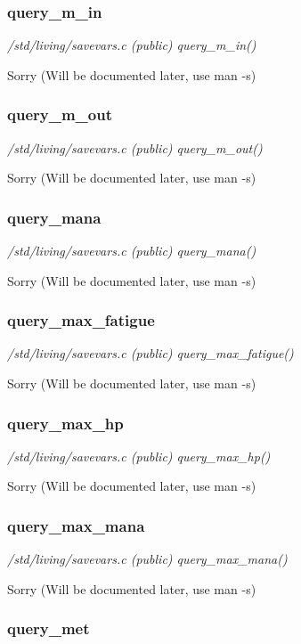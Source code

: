 \subsubsection{query\_m\_in}

{\em /std/living/savevars.c (public) query\_m\_in()}

Sorry (Will be documented later, use man -s)


\subsubsection{query\_m\_out}

{\em /std/living/savevars.c (public) query\_m\_out()}

Sorry (Will be documented later, use man -s)


\subsubsection{query\_mana}

{\em /std/living/savevars.c (public) query\_mana()}

Sorry (Will be documented later, use man -s)


\subsubsection{query\_max\_fatigue}

{\em /std/living/savevars.c (public) query\_max\_fatigue()}

Sorry (Will be documented later, use man -s)


\subsubsection{query\_max\_hp}

{\em /std/living/savevars.c (public) query\_max\_hp()}

Sorry (Will be documented later, use man -s)


\subsubsection{query\_max\_mana}

{\em /std/living/savevars.c (public) query\_max\_mana()}

Sorry (Will be documented later, use man -s)


\subsubsection{query\_met}

